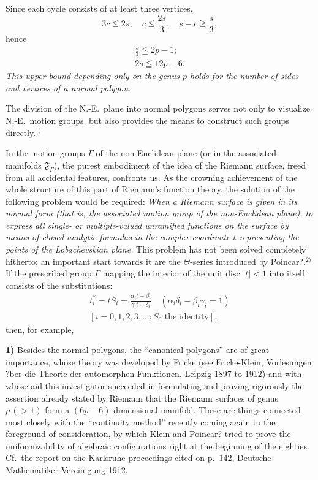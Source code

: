 \documentclass{article}
\begin{document}
Since each cycle consists of at least three vertices,
\[ 3c \leqq 2s, \quad c \leqq \frac{2s}{3}, \quad s - c \geqq \frac{s}{3}, \]
hence
\[ \begin{gathered} \frac{s}{3} \leqq 2p - 1; \\ 2s \leqq 12p - 6. \end{gathered} \]
\emph{This upper bound depending only on the genus $p$ holds for the number of sides and vertices of a normal polygon.}

The division of the N.-E.\ plane into normal polygons serves not only to visualize N.-E.\ motion groups, but also provides the means to construct such groups directly.${}^{1)}$

In the motion groups $\varGamma$ of the non-Euclidean plane (or in the associated manifolds $\mathfrak{F}_\varGamma$), the purest embodiment of the idea of the Riemann surface, freed from all accidental features, confronts us. As the crowning achievement of the whole structure of this part of Riemann's function theory, the solution of the following problem would be required: \emph{When a Riemann surface is given in its normal form (that is, the associated motion group of the non-Euclidean plane), to express all single- or multiple-valued unramified functions on the surface by means of closed analytic formulas in the complex coordinate $t$ representing the points of the Lobachevskian plane.} This problem has not been solved completely hitherto; an important start towards it are the $\Theta$-series introduced by Poincar?.${}^{2)}$ If the prescribed group $\varGamma$ mapping the interior of the unit disc $|t| < 1$ into itself consists of the substitutions:
\[ \begin{gathered} t_i^* = tS_i = \frac{\alpha_i t + \beta_i}{\gamma_i t + \delta_i} \quad (\alpha_i\delta_i - \beta_i\gamma_i = 1) \\ [i = 0, 1, 2, 3, \dots; S_0 \text{ the identity}], \end{gathered} \]
then, for example,

\textbf{1)} Besides the normal polygons, the ``canonical polygons'' are of great importance, whose theory was developed by Fricke (see Fricke-Klein, Vorlesungen ?ber die Theorie der automorphen Funktionen, Leipzig 1897 to 1912) and with whose aid this investigator succeeded in formulating and proving rigorously the assertion already stated by Riemann that the Riemann surfaces of genus $p\,(> 1)$ form a $(6p - 6)$-dimensional manifold. These are things connected most closely with the ``continuity method'' recently coming again to the foreground of consideration, by which Klein and Poincar? tried to prove the uniformizability of algebraic configurations right at the beginning of the eighties. Cf.\ the report on the Karlsruhe proceedings cited on p.~142, Deutsche Mathematiker-Vereinigung 1912.
\end{document}
